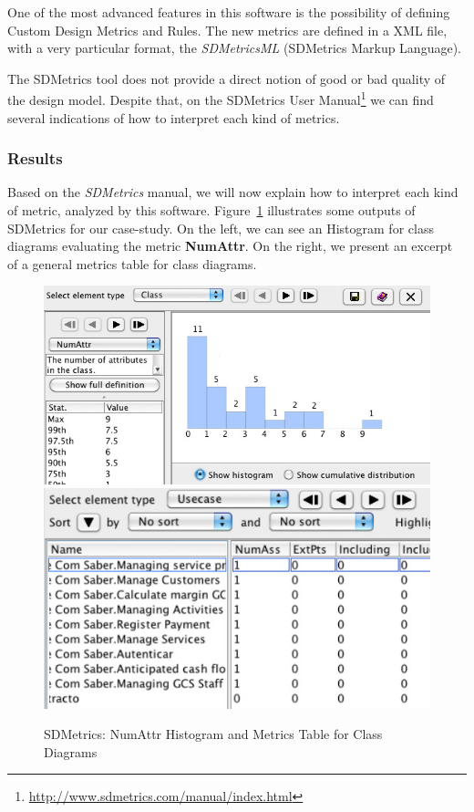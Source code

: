 One of the most advanced features in this software is the possibility of defining Custom Design Metrics and Rules. 
The new metrics are defined in a XML file, with a very particular format, the \textit{SDMetricsML} (SDMetrics Markup Language).

The SDMetrics tool does not provide a direct notion of good or bad quality of the design model. 
Despite that, on the SDMetrics User Manual\footnote{\url{http://www.sdmetrics.com/manual/index.html}} we can find several indications of how to interpret each kind of metrics. 
 
\subsubsection{Results}
Based on the \textit{SDMetrics} manual, we will now explain how to interpret each kind of metric, analyzed by this software. 
Figure~\ref{fig:sdmetrics} illustrates some outputs of SDMetrics for our case-study. 
On the left, we can see an Histogram for class diagrams evaluating the metric \textbf{NumAttr}. On the right, we present an excerpt of a general metrics table for class diagrams.

\begin{figure}[htbp]
\includegraphics[scale=0.3]{images/histogram2}
\hspace{0.1cm}
\includegraphics[scale=0.32]{images/table3}
\caption{SDMetrics: \textsf{NumAttr} Histogram and Metrics Table for Class Diagrams}
\label{fig:sdmetrics}
\end{figure}


